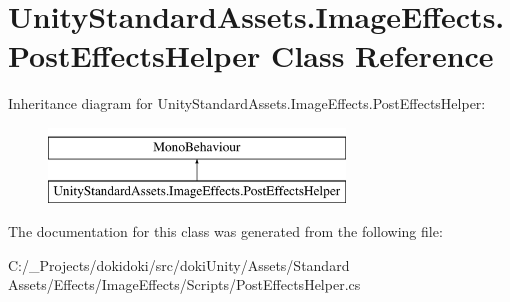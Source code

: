 \hypertarget{class_unity_standard_assets_1_1_image_effects_1_1_post_effects_helper}{}\section{Unity\+Standard\+Assets.\+Image\+Effects.\+Post\+Effects\+Helper Class Reference}
\label{class_unity_standard_assets_1_1_image_effects_1_1_post_effects_helper}
Inheritance diagram for Unity\+Standard\+Assets.\+Image\+Effects.\+Post\+Effects\+Helper\+:\begin{figure}[H]
\begin{center}
\leavevmode
\includegraphics[height=2.000000cm]{class_unity_standard_assets_1_1_image_effects_1_1_post_effects_helper}
\end{center}
\end{figure}


The documentation for this class was generated from the following file\+:\begin{DoxyCompactItemize}
\item 
C\+:/\+\_\+\+Projects/dokidoki/src/doki\+Unity/\+Assets/\+Standard Assets/\+Effects/\+Image\+Effects/\+Scripts/Post\+Effects\+Helper.\+cs\end{DoxyCompactItemize}
